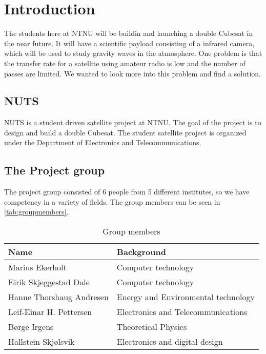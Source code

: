 \chapter{Introduction}
\label{chap:introduction}

The students here at NTNU will be buildin and launching a double Cubesat in the near future. It will have a scientific payload consisting of a infrared camera, which will be used to study gravity waves in the atmosphere. One problem is that the transfer rate for a satellite using amateur radio is low and the number of passes are limited. We wanted to look more into this problem and find a solution.


\section{NUTS}

NUTS is a student driven satellite project at NTNU. The goal of the project is to design and build a double Cubesat. The student satellite project is organized under the  Department of Electronics and Telecommunications. 

\section{The Project group}
The project group consisted of 6 people from 5 different institutes, so we have competency in a variety of fields. The group members can be seen in \autoref{tab:groupmembers}.

\begin{table}
	\begin{center}
		\begin{tabular}{|l|l|}   
			\hline      
			\bf{Name} & \bf{Background} \\ 
			\hline
			Marius Ekerholt & Computer technology\\     
			\hline
			Eirik Skjeggestad Dale & Computer technology\\     
			\hline
			Hanne Thorshaug Andresen & Energy and Environmental technology\\     
			\hline
			Leif-Einar H. Pettersen & Electronics and Telecommunications\\     
			\hline
			Børge Irgens & Theoretical Physics\\     
			\hline
			Hallstein Skjølsvik & Electronics and digital design\\     
			\hline
		 \end{tabular}
	\end{center}
	\caption{Group members}
	\label{tab:groupmembers}
\end{table}
